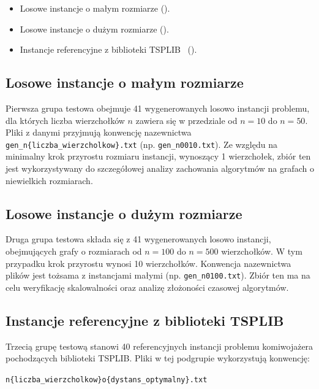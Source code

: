\documentclass{article}
\theoremstyle{definition}
\theoremstyle{plain}
\theoremstyle{remark}
\begin{document}
\begin{itemize}
    \item Losowe instancje o małym rozmiarze ().
    \item Losowe instancje o dużym rozmiarze ().
    \item Instancje referencyjne z biblioteki TSPLIB~\cite{reinelt1991tsplib, tsplib_mastqe} ().
\end{itemize}

\subsection{Losowe instancje o małym rozmiarze}

Pierwsza grupa testowa obejmuje 41 wygenerowanych losowo instancji problemu, dla których liczba wierzchołków $n$ zawiera się w przedziale od $n=10$ do $n=50$. Pliki z danymi przyjmują konwencję nazewnictwa \texttt{gen\_n\{liczba\_wierzcholkow\}.txt} (np. \texttt{gen\_n0010.txt}). Ze względu na minimalny krok przyrostu rozmiaru instancji, wynoszący 1 wierzchołek, zbiór ten jest wykorzystywany do szczegółowej analizy zachowania algorytmów na grafach o niewielkich rozmiarach.

\subsection{Losowe instancje o dużym rozmiarze}

Druga grupa testowa składa się z 41 wygenerowanych losowo instancji, obejmujących grafy o rozmiarach od $n=100$ do $n=500$ wierzchołków. W tym przypadku krok przyrostu wynosi 10 wierzchołków. Konwencja nazewnictwa plików jest tożsama z instancjami małymi (np. \texttt{gen\_n0100.txt}). Zbiór ten ma na celu weryfikację skalowalności oraz analizę złożoności czasowej algorytmów.

\subsection{Instancje referencyjne z biblioteki TSPLIB}

Trzecią grupę testową stanowi 40 referencyjnych instancji problemu komiwojażera pochodzących biblioteki TSPLIB. Pliki w tej podgrupie wykorzystują konwencję:

\begin{center}
\texttt{n\{liczba\_wierzcholkow\}o\{dystans\_optymalny\}.txt}
\end{center}
\end{document}
